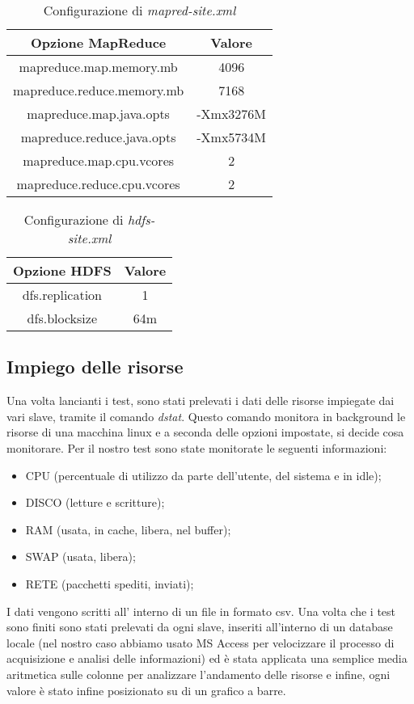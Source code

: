 \begin{table}[H]
	\begin{center}
		\begin{tabular}{ | c | c |}
			\hline
			\textbf{Opzione MapReduce}  & \textbf{Valore} \\
			\hline
			mapreduce.map.memory.mb     & 4096            \\
			\hline
			mapreduce.reduce.memory.mb  & 7168            \\
			\hline
			mapreduce.map.java.opts     & -Xmx3276M       \\
			\hline
			mapreduce.reduce.java.opts  & -Xmx5734M       \\
			\hline
			mapreduce.map.cpu.vcores    & 2               \\
			\hline
			mapreduce.reduce.cpu.vcores & 2               \\
			\hline
		\end{tabular}
		\caption{Configurazione di \textit{mapred-site.xml}}
	\end{center}
\end{table}
\begin{table}[H]
	\begin{center}
		\begin{tabular}{ | c | c |}
			\hline
			\textbf{Opzione HDFS} & \textbf{Valore} \\
			\hline
			dfs.replication       & 1               \\
			\hline
			dfs.blocksize         & 64m             \\
			\hline
		\end{tabular}
		\caption{Configurazione di \textit{hdfs-site.xml}}
	\end{center}
\end{table}
\subsection{Impiego delle risorse}
Una volta lancianti i test, sono stati prelevati i dati delle risorse impiegate dai vari slave, tramite il comando \textit{dstat}. Questo comando monitora in background le risorse di una macchina linux e a seconda delle opzioni impostate, si decide cosa monitorare. Per il nostro test sono state monitorate le seguenti informazioni:
\begin{itemize}
\item CPU (percentuale di utilizzo da parte dell'utente, del sistema e in idle);
\item DISCO (letture e scritture);
\item RAM (usata, in cache, libera, nel buffer);
\item SWAP (usata, libera);
\item RETE (pacchetti spediti, inviati);
\end{itemize}
I dati vengono scritti all' interno di un file in formato csv. Una volta che i test sono finiti sono stati prelevati da ogni slave, inseriti all'interno di un database locale (nel nostro caso abbiamo usato MS Access per velocizzare il processo di acquisizione e analisi delle informazioni) ed è stata applicata una semplice media aritmetica sulle colonne per analizzare l'andamento delle risorse e infine, ogni valore è stato infine posizionato su di un grafico a barre.
